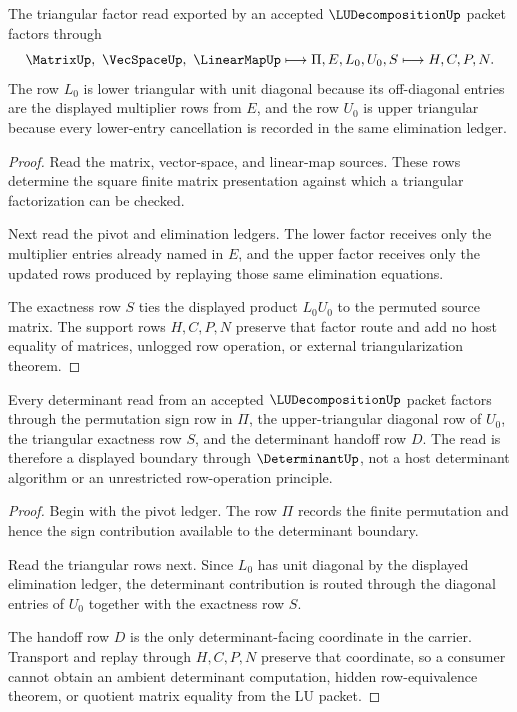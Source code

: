 \begin{theorem}
\label{thm:lu-decomposition-triangular-factor-route}
The triangular factor read exported by an accepted $\LUDecompositionUp$ packet factors through
$$
\MatrixUp,\ \VecSpaceUp,\ \LinearMapUp
\longmapsto
\Pi,E,L_0,U_0,S
\longmapsto
H,C,P,N.
$$
The row $L_0$ is lower triangular with unit diagonal because its off-diagonal entries are the displayed multiplier rows from $E$, and the row $U_0$ is upper triangular because every lower-entry cancellation is recorded in the same elimination ledger.
\end{theorem}
\begin{proof}
Read the matrix, vector-space, and linear-map sources. These rows determine the square finite matrix presentation against which a triangular factorization can be checked.

Next read the pivot and elimination ledgers. The lower factor receives only the multiplier entries already named in $E$, and the upper factor receives only the updated rows produced by replaying those same elimination equations.

The exactness row $S$ ties the displayed product $L_0U_0$ to the permuted source matrix. The support rows $H,C,P,N$ preserve that factor route and add no host equality of matrices, unlogged row operation, or external triangularization theorem.
\end{proof}

\begin{theorem}
\label{thm:lu-decomposition-determinant-boundary}
Every determinant read from an accepted $\LUDecompositionUp$ packet factors through the permutation sign row in $\Pi$, the upper-triangular diagonal row of $U_0$, the triangular exactness row $S$, and the determinant handoff row $D$. The read is therefore a displayed boundary through $\DeterminantUp$, not a host determinant algorithm or an unrestricted row-operation principle.
\end{theorem}
\begin{proof}
Begin with the pivot ledger. The row $\Pi$ records the finite permutation and hence the sign contribution available to the determinant boundary.

Read the triangular rows next. Since $L_0$ has unit diagonal by the displayed elimination ledger, the determinant contribution is routed through the diagonal entries of $U_0$ together with the exactness row $S$.

The handoff row $D$ is the only determinant-facing coordinate in the carrier. Transport and replay through $H,C,P,N$ preserve that coordinate, so a consumer cannot obtain an ambient determinant computation, hidden row-equivalence theorem, or quotient matrix equality from the LU packet.
\end{proof}

